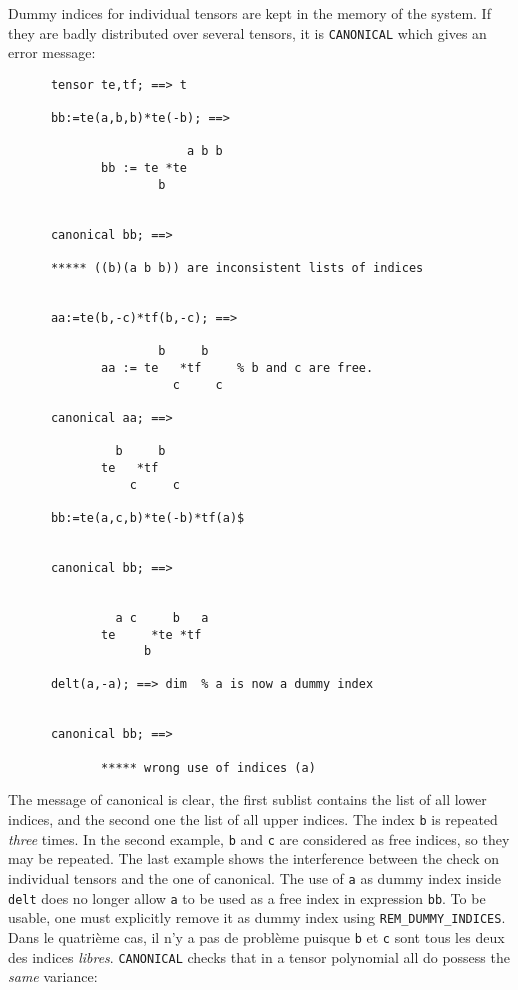 Dummy indices for individual tensors are kept in the memory of 
the system. If they are badly distributed over several tensors,
it is \texttt{CANONICAL} which gives an error message:  
\begin{verbatim}
      tensor te,tf; ==> t

      bb:=te(a,b,b)*te(-b); ==>

                         a b b
             bb := te *te
                     b


      canonical bb; ==>

      ***** ((b)(a b b)) are inconsistent lists of indices


      aa:=te(b,-c)*tf(b,-c); ==>

                     b     b
             aa := te   *tf     % b and c are free.
                       c     c

      canonical aa; ==>

               b     b
             te   *tf
                 c     c

      bb:=te(a,c,b)*te(-b)*tf(a)$


      canonical bb; ==>


               a c     b   a
             te     *te *tf
                   b

      delt(a,-a); ==> dim  % a is now a dummy index


      canonical bb; ==>

             ***** wrong use of indices (a)
\end{verbatim}
The message of canonical is clear, the first sublist contains the 
list of all lower indices, and the second one the list of all upper 
indices. The index  \texttt{b} is repeated \emph{three} times.
In the second example, \texttt{b} and \texttt{c} are considered as free
indices, so they may be repeated.
The last example shows the interference between the check on 
individual tensors and the one of canonical. The use of \texttt{a}
as dummy index inside \texttt{delt} does no longer allow \texttt{a}  
to be used as a free index in expression \texttt{bb}. 
To be usable, one must explicitly remove it as dummy index 
using \texttt{REM\_DUMMY\_INDICES}.
Dans le quatri\`eme cas, il n'y a pas de probl\`eme puisque \texttt{b} et 
\texttt{c} sont tous les deux des indices \emph{libres}.
\texttt{CANONICAL} checks that in a tensor polynomial 
all do possess the \emph{same} variance:
